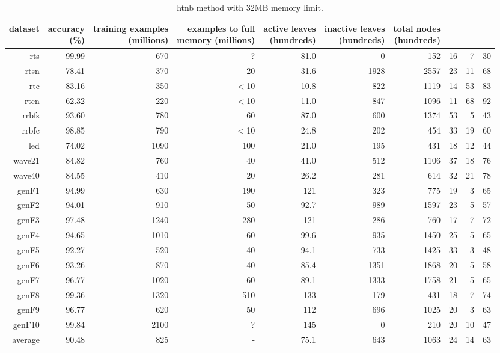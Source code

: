 \clearpage
\begin{table}
\caption{{\sc htnb} method with 32MB memory limit.}
\label{tab:htnb-32MB}
\centering
\begin{tabular}{|r|r|r|r|r|r|r|r|r|r|}
\hline
dataset	&
\rotatebox{90}{\parbox{9em}{accuracy\\(\%)}} &
\rotatebox{90}{\parbox{9em}{training examples\\(millions)}} &
\rotatebox{90}{\parbox{9em}{examples to full\\memory (millions)}} &
\rotatebox{90}{\parbox{9em}{active leaves\\(hundreds)}} &
\rotatebox{90}{\parbox{9em}{inactive leaves\\(hundreds)}} &
\rotatebox{90}{\parbox{9em}{total nodes\\(hundreds)}} &
\rotatebox{90}{\parbox{9em}{tree depth}}	&
\rotatebox{90}{\parbox{9em}{training speed (\%)}} &
\rotatebox{90}{\parbox{9em}{prediction speed (\%)}} \\
\hline
{\sc rts} & 99.99 & 670 & ? & 81.0 & 0 & 152 & 16 & 7 & 30 \\
{\sc rtsn} & 78.41 & 370 & 20 & 31.6 & 1928 & 2557 & 23 & 11 & 68 \\
{\sc rtc} & 83.16 & 350 & $<$10 & 10.8 & 822 & 1119 & 14 & 53 & 83 \\
{\sc rtcn} & 62.32 & 220 & $<$10 & 11.0 & 847 & 1096 & 11 & 68 & 92 \\
{\sc rrbfs} & 93.60 & 780 & 60 & 87.0 & 600 & 1374 & 53 & 5 & 43 \\
{\sc rrbfc} & 98.85 & 790 & $<$10 & 24.8 & 202 & 454 & 33 & 19 & 60 \\
{\sc led} & 74.02 & 1090 & 100 & 21.0 & 195 & 431 & 18 & 12 & 44 \\
{\sc wave21} & 84.82 & 760 & 40 & 41.0 & 512 & 1106 & 37 & 18 & 76 \\
{\sc wave40} & 84.55 & 410 & 20 & 26.2 & 281 & 614 & 32 & 21 & 78 \\
{\sc genF1} & 94.99 & 630 & 190 & 121 & 323 & 775 & 19 & 3 & 65 \\
{\sc genF2} & 94.01 & 910 & 50 & 92.7 & 989 & 1597 & 23 & 5 & 57 \\
{\sc genF3} & 97.48 & 1240 & 280 & 121 & 286 & 760 & 17 & 7 & 72 \\
{\sc genF4} & 94.65 & 1010 & 60 & 99.6 & 935 & 1450 & 25 & 5 & 65 \\
{\sc genF5} & 92.27 & 520 & 40 & 94.1 & 733 & 1425 & 33 & 3 & 48 \\
{\sc genF6} & 93.26 & 870 & 40 & 85.4 & 1351 & 1868 & 20 & 5 & 58 \\
{\sc genF7} & 96.77 & 1020 & 60 & 89.1 & 1333 & 1758 & 21 & 5 & 65 \\
{\sc genF8} & 99.36 & 1320 & 510 & 133 & 179 & 431 & 18 & 7 & 74 \\
{\sc genF9} & 96.77 & 620 & 50 & 112 & 696 & 1025 & 20 & 3 & 63 \\
{\sc genF10} & 99.84 & 2100 & ? & 145 & 0 & 210 & 20 & 10 & 47 \\
\hline
average & 90.48 & 825 &  -  & 75.1 & 643 & 1063 & 24 & 14 & 63 \\
\hline
\end{tabular}
\end{table}
